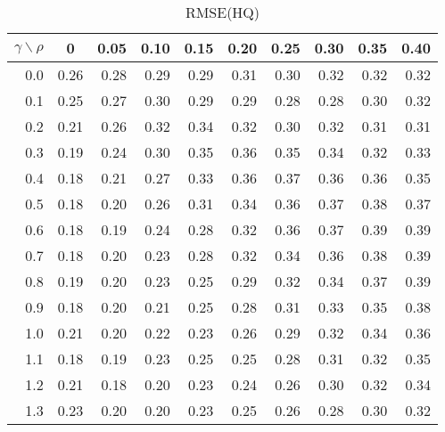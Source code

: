 \documentclass[12pt]{article}
\begin{document}
%
\begin{table}[!tbp]
\caption{RMSE(HQ)}
 \begin{center}
 \begin{tabular}{r|rrrrrrrrr}\hline\hline
\multicolumn{1}{c|}{$\gamma\backslash\rho$}&\multicolumn{1}{c}{0}&\multicolumn{1}{c}{0.05}&\multicolumn{1}{c}{0.10}&\multicolumn{1}{c}{0.15}&\multicolumn{1}{c}{0.20}&\multicolumn{1}{c}{0.25}&\multicolumn{1}{c}{0.30}&\multicolumn{1}{c}{0.35}&\multicolumn{1}{c}{0.40}\tabularnewline
\hline
0.0&0.26&0.28&0.29&0.29&0.31&0.30&0.32&0.32&0.32\tabularnewline
0.1&0.25&0.27&0.30&0.29&0.29&0.28&0.28&0.30&0.32\tabularnewline
0.2&0.21&0.26&0.32&0.34&0.32&0.30&0.32&0.31&0.31\tabularnewline
0.3&0.19&0.24&0.30&0.35&0.36&0.35&0.34&0.32&0.33\tabularnewline
0.4&0.18&0.21&0.27&0.33&0.36&0.37&0.36&0.36&0.35\tabularnewline
0.5&0.18&0.20&0.26&0.31&0.34&0.36&0.37&0.38&0.37\tabularnewline
0.6&0.18&0.19&0.24&0.28&0.32&0.36&0.37&0.39&0.39\tabularnewline
0.7&0.18&0.20&0.23&0.28&0.32&0.34&0.36&0.38&0.39\tabularnewline
0.8&0.19&0.20&0.23&0.25&0.29&0.32&0.34&0.37&0.39\tabularnewline
0.9&0.18&0.20&0.21&0.25&0.28&0.31&0.33&0.35&0.38\tabularnewline
1.0&0.21&0.20&0.22&0.23&0.26&0.29&0.32&0.34&0.36\tabularnewline
1.1&0.18&0.19&0.23&0.25&0.25&0.28&0.31&0.32&0.35\tabularnewline
1.2&0.21&0.18&0.20&0.23&0.24&0.26&0.30&0.32&0.34\tabularnewline
1.3&0.23&0.20&0.20&0.23&0.25&0.26&0.28&0.30&0.32\tabularnewline
\hline
\end{tabular}

\end{center}

\end{table}
\end{document}

